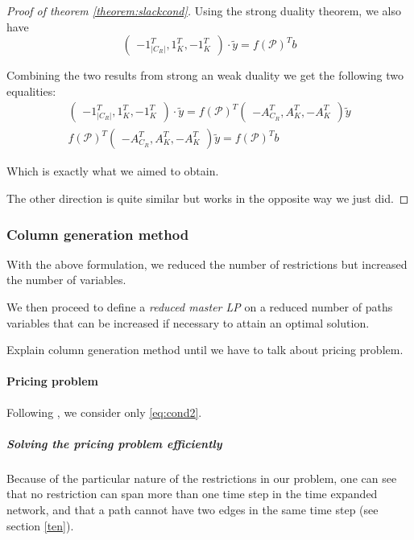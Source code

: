 \documentclass[14pt,a4paper]{article}
\theoremstyle{definition}
\numberwithin{equation}{subsection}
\begin{document}
\begin{proof}[Proof of theorem \ref{theorem:slackcond}]
 Using the strong duality theorem, we also have 
 $$\left( \begin{matrix} -1_{|C_R|}^T, 1_K^T, -1_K^T  \end{matrix} \right)\cdot \tilde{y} =  f(\mathcal{P})^Tb  $$

Combining the two results from strong an weak duality we get the following two equalities:
\begin{align*}
\left( \begin{matrix} -1_{|C_R|}^T, 1_K^T, -1_K^T  \end{matrix} \right)\cdot \tilde{y} = 
f(\mathcal{P})^T \left( \begin{matrix} -A_{C_R}^T, A_K^T, -A_K^T \end{matrix} \right)\tilde{y} \\
f(\mathcal{P})^T \left( \begin{matrix} -A_{C_R}^T, A_K^T, -A_K^T \end{matrix} \right)\tilde{y} =  f(\mathcal{P})^Tb 
\end{align*}

Which is exactly what we aimed to obtain.

The other direction is quite similar but works in the opposite way we just did.

	 
	 
\end{proof}
\subsubsection{Column generation method}

With the above formulation,  we reduced the number of restrictions but increased the number of variables. 

We then proceed to define a \emph{reduced master LP} on a reduced number of paths variables that can be increased if necessary to attain an optimal solution.


Explain column generation method until we have to talk about pricing problem.

\paragraph{Pricing problem}
Following \cite[p.~669]{networkflows}, we consider only \eqref{eq:cond2}. 

\subparagraph{Solving the pricing problem efficiently}
Because of the particular nature of the restrictions in our problem, one can see that no restriction can span more than one time step in the time expanded network, and that a path cannot have two edges in the same time step (see section \ref*{ten}). 
\end{document}
